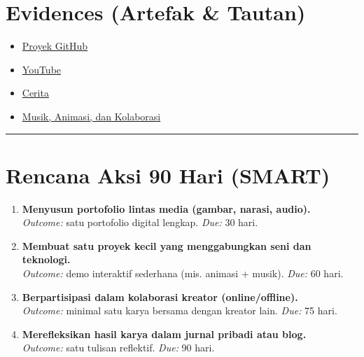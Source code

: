 \documentclass[
  letterpaper,
  DIV=11,
  numbers=noendperiod]{scrreprt}
\providecommand{\tightlist}{%
  \setlength{\itemsep}{0pt}\setlength{\parskip}{0pt}}
\begin{document}
\section{Evidences (Artefak \& Tautan)}\label{evidences-artefak-tautan}

\begin{itemize}
\tightlist
\item
  \href{https://github.com/Cola1000}{Proyek GitHub}
\item
  \href{https://www.youtube.com/@rhio_bimo}{YouTube}
\item
  \href{https://drive.google.com/file/d/1FNOzeGAWfki8vhwjgplE_HTZeMb2h2v2/view?usp=sharing}{Cerita}
\item
  \href{https://youtu.be/twUFbqyul_M?si=FQHlKCV-SloIxgd1}{Musik,
  Animasi, dan Kolaborasi}
\end{itemize}

\begin{center}\rule{0.5\linewidth}{0.5pt}\end{center}

\section{Rencana Aksi 90 Hari (SMART)}\label{rencana-aksi-90-hari-smart}

\begin{enumerate}
\def\labelenumi{\arabic{enumi}.}
\tightlist
\item
  \textbf{Menyusun portofolio lintas media (gambar, narasi, audio).}\\
  \emph{Outcome:} satu portofolio digital lengkap. \emph{Due:} 30
  hari.\\
\item
  \textbf{Membuat satu proyek kecil yang menggabungkan seni dan
  teknologi.}\\
  \emph{Outcome:} demo interaktif sederhana (mis. animasi + musik).
  \emph{Due:} 60 hari.\\
\item
  \textbf{Berpartisipasi dalam kolaborasi kreator (online/offline).}\\
  \emph{Outcome:} minimal satu karya bersama dengan kreator lain.
  \emph{Due:} 75 hari.\\
\item
  \textbf{Merefleksikan hasil karya dalam jurnal pribadi atau blog.}\\
  \emph{Outcome:} satu tulisan reflektif. \emph{Due:} 90 hari.
\end{enumerate}
\end{document}
